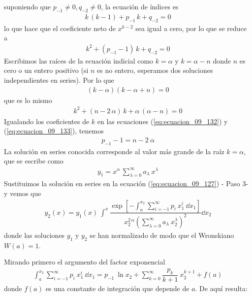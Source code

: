 suponiendo que $p_{-1} \neq 0, q_{-2} \neq 0$, la ecuación de índices es
\begin{align*}
k \, (k - 1) + p_{-1} \, k + q_{-2} = 0
\end{align*}
lo que hace que el coeficiente neto de $x^{k-2}$ sea igual a cero, por lo que se reduce a
\begin{align}
k^{2} + (p_{-1} - 1) \, k + q_{-2} = 0
\label{eq:ecuacion_09_132}
\end{align}
Escribimos las raíces de la ecuación indicial como $k = \alpha$ y $k= \alpha - n$ donde $n$ es cero o un entero positivo (si $n$ es no entero, esperamos dos soluciones independientes en series). Por lo que
\begin{align}
(k - \alpha)(k - \alpha + n) = 0
\label{eq:ecuacion_09_133}
\end{align}
que es lo mismo
\begin{align*}
k^{2} + (n - 2 \, \alpha) \, k + \alpha \, (\alpha - n) = 0
\end{align*}
Igualando los coeficientes de $k$ en las ecuaciones (\ref{eq:ecuacion_09_132}) y (\ref{eq:ecuacion_09_133}), tenemos
\begin{align}
p_{-1} -1 = n - 2 \: \alpha
\label{eq:ecuacion_09_134}
\end{align}
La solución en series conocida corresponde al valor más grande de la raíz $k = \alpha$, que se escribe como
\begin{align*}
y_{1} =  x^{\alpha} \, \sum_{\lambda=0}^{\infty} a_{\lambda} \: x^{\lambda}
\end{align*}
Sustituimos la solución en series en la ecuación (\ref{eq:ecuacion_09_127}) - Paso 3- y vemos que
\begin{align}
y_{2}(x) = y_{1} (x) \: \int^{x} \dfrac{\exp \left[ \displaystyle - \int_{a}^{x_{2}} \sum_{i=-1}^{\infty} p_{i} \: x^{i}_{1} \: \dd{x_{1}} \right] }{x_{2}^{2 \, \alpha} \left( \displaystyle \sum_{\lambda=0}^\infty a_{\lambda} \: x_{2}^{\lambda} \right)^{2} } \dd{x_{2}}
\label{eq:ecuacion_09_135}
\end{align}
donde las soluciones $y_{1}$ y $y_{2}$ se han normalizado de modo que el Wronskiano $W(a)=1$. 
\par
Mirando primero el argumento del factor exponencial
\begin{align}
\int_{a}^{x_{2}} \sum_{i=-1}^{\infty} p_{i} \: x_{1}^{i} \: \dd{x_{1}} = p_{-1} \: \ln x_{2} + \sum_{k=0}^{\infty} \dfrac{p_{k}}{k + 1} \: x_{2}^{k + 1} + f(a)
\label{eq:ecuacion_09_136}
\end{align}
donde $f(a)$ es una constante de integración que depende de $a$. De aquí resulta:
